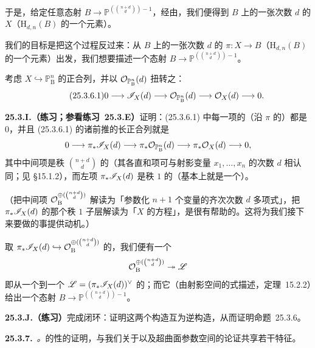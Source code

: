 于是，给定任意态射 $B\to\mathbb{P}^{(\binom{n+d}{d})-1}$，经由\trPullback{}，我们便得到 $B$ 上的一张次数 $d$ 的\trHypersurface{} $X$（$\mathrm{H}_{d,n}(B)$ 的一个元素）。

我们的目标是把这个过程反过来：从 $B$ 上的一张次数 $d$ 的\trHypersurface{} $\pi\colon X\to B$（$\mathrm{H}_{d,n}(B)$ 的一个元素）出发，我们想要描述一个态射 $B\to\mathbb{P}^{(\binom{n+d}{d})-1}$。

考虑 $X\hookrightarrow\mathbb{P}^n_{\mathrm{B}}$ 的\trClosedSubscheme{}正合列，并以 $\mathcal{O}_{\mathbb{P}^n_{\mathrm{B}}}(d)$ 扭转之：
\begin{equation*}\tag{25.3.6.1}\label{eq:hypersurface-ideal-sequence}
0\longrightarrow\mathscr{I}_X(d)\longrightarrow\mathcal{O}_{\mathbb{P}^n_{\mathrm{B}}}(d)\longrightarrow\mathcal{O}_X(d)\longrightarrow 0.
\end{equation*}

\textbf{25.3.I.（练习；参看\mbox{练习~25.3.E}）}\quad 证明：(25.3.6.1) 中每一项的（沿 $\pi$ 的）\trHigherPushforward{}都是 $0$，并且 (25.3.6.1) 的诸前推的长正合列就是
\[
0\longrightarrow\pi_*\mathscr{I}_X(d)\longrightarrow\pi_*\mathcal{O}_{\mathbb{P}^n_{\mathrm{B}}}(d)\longrightarrow\pi_*\mathcal{O}_X(d)\longrightarrow 0,
\]
其中中间项是秩 $\binom{n+d}{d}$ 的\trFreeSheaf{}（其各直和项可与射影变量 $x_1,\dots,x_n$ 的次数 $d$ \trMonomial{}相认同；见 \S15.1.2），而左项 $\pi_*\mathscr{I}_X(d)$ 是秩 $1$ 的\trLocallyFreeSheaf（基本上就是一个\trLineBundle）。

（把中间项 $\mathcal{O}_{\mathrm{B}}^{\oplus(\binom{n+d}{d})}$ 解读为「参数化 $n+1$ 个变量的齐次次数 $d$ 多项式」，把 $\pi_*\mathscr{I}_X(d)$ 的那个秩 $1$ 子层解读为「$X$ 的方程」，是很有帮助的。这将为我们接下来要做的事提供动机。）

取\trInjectiveMap{} $\pi_*\mathscr{I}_X(d)\hookrightarrow\mathcal{O}_{\mathrm{B}}^{\oplus(\binom{n+d}{d})}$ 的\trDual，我们便有一个\trSurjectiveMap{}
\[
\mathcal{O}_{\mathrm{B}}^{\oplus(\binom{n+d}{d})}\twoheadrightarrow\mathscr{L}
\]
即从一个\trFreeSheaf{}到一个\trInvertibleSheaf{} $\mathscr{L}=(\pi_*\mathscr{I}_X(d))^\vee$ 的\trSurjectiveMap{}；而它（由射影空间的\trFunctor{}式描述，\mbox{定理~15.2.2}）给出一个态射 $B\to\mathbb{P}^{(\binom{n+d}{d})-1}$。

\textbf{25.3.J.（练习）}\quad 完成闭环：证明这两个构造互为逆构造，从而证明\mbox{命题~25.3.6}。

\textbf{25.3.7.}\ \emph{\trhRemark。}\quad \trHilbertScheme{}的\trRepresentable{}性的证明，与我们关于\trGrassmannian{}以及超曲面参数空间的论证共享若干特征。
